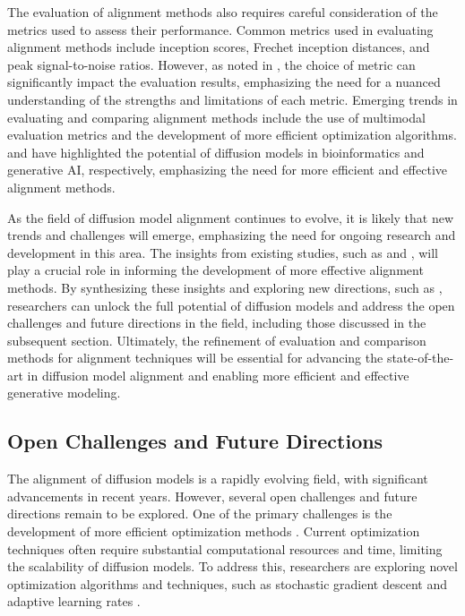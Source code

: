 \documentclass[11pt,a4paper]{article}
\begin{document}
The evaluation of alignment methods also requires careful consideration of the metrics used to assess their performance. Common metrics used in evaluating alignment methods include inception scores, Frechet inception distances, and peak signal-to-noise ratios. However, as noted in \cite{doi:10.3390/e25040633}, the choice of metric can significantly impact the evaluation results, emphasizing the need for a nuanced understanding of the strengths and limitations of each metric. Emerging trends in evaluating and comparing alignment methods include the use of multimodal evaluation metrics and the development of more efficient optimization algorithms. \cite{arxiv:2302.10907} and \cite{doi:10.1093/nsr/nwae348} have highlighted the potential of diffusion models in bioinformatics and generative AI, respectively, emphasizing the need for more efficient and effective alignment methods.

As the field of diffusion model alignment continues to evolve, it is likely that new trends and challenges will emerge, emphasizing the need for ongoing research and development in this area. The insights from existing studies, such as \cite{arxiv:2410.02543} and \cite{arxiv:2406.01572}, will play a crucial role in informing the development of more effective alignment methods. By synthesizing these insights and exploring new directions, such as \cite{arxiv:2512.15923}, researchers can unlock the full potential of diffusion models and address the open challenges and future directions in the field, including those discussed in the subsequent section. Ultimately, the refinement of evaluation and comparison methods for alignment techniques will be essential for advancing the state-of-the-art in diffusion model alignment and enabling more efficient and effective generative modeling.


\subsection{Open Challenges and Future Directions}


The alignment of diffusion models is a rapidly evolving field, with significant advancements in recent years. However, several open challenges and future directions remain to be explored. One of the primary challenges is the development of more efficient optimization methods \cite{arxiv:2502.06805}. Current optimization techniques often require substantial computational resources and time, limiting the scalability of diffusion models. To address this, researchers are exploring novel optimization algorithms and techniques, such as stochastic gradient descent and adaptive learning rates \cite{doi:10.1109/cvpr52734.2025.02198}.
\end{document}
